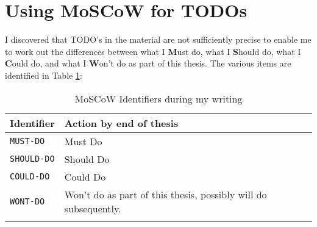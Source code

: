 
\section{Using MoSCoW for TODOs}
I discovered that TODO's in the material are not sufficiently precise to enable me to work out the differences between what I \textbf{M}ust do, what I \textbf{S}hould do, what I \textbf{C}ould do, and what I \textbf{W}on't do as part of this thesis. The various items are identified in Table \ref{tab:moscow_for_todos}:

\begin{table}[htbp!]
    \centering
    \begin{tabular}{l|l}
       Identifier         &Action by end of thesis \\
       \hline
       \texttt{MUST-DO}   &Must Do  \\
       \texttt{SHOULD-DO} &Should Do \\
       \texttt{COULD-DO}  &Could Do \\
       \texttt{WONT-DO}   &Won't do as part of this thesis, possibly will do subsequently. \\
         & 
    \end{tabular}
    \caption{MoSCoW Identifiers during my writing}
    \label{tab:moscow_for_todos}
\end{table}

